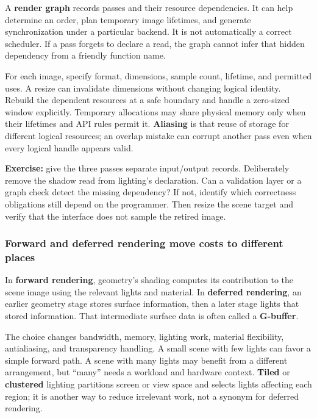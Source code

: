 A \textbf{render graph} records passes and their resource dependencies. It can help determine an order, plan temporary image lifetimes, and generate synchronization under a particular backend. It is not automatically a correct scheduler. If a pass forgets to declare a read, the graph cannot infer that hidden dependency from a friendly function name.

For each image, specify format, dimensions, sample count, lifetime, and permitted uses. A resize can invalidate dimensions without changing logical identity. Rebuild the dependent resources at a safe boundary and handle a zero-sized window explicitly. Temporary allocations may share physical memory only when their lifetimes and API rules permit it. \textbf{Aliasing} is that reuse of storage for different logical resources; an overlap mistake can corrupt another pass even when every logical handle appears valid.

\textbf{Exercise:} give the three passes separate input/output records. Deliberately remove the shadow read from lighting's declaration. Can a validation layer or a graph check detect the missing dependency? If not, identify which correctness obligations still depend on the programmer. Then resize the scene target and verify that the interface does not sample the retired image.

\subsubsection{Forward and deferred rendering move costs to different places}\label{06-engine-ii-ch026-forward-and-deferred-rendering-move-costs-to-different-places}

In \textbf{forward rendering}, geometry's shading computes its contribution to the scene image using the relevant lights and material. In \textbf{deferred rendering}, an earlier geometry stage stores surface information, then a later stage lights that stored information. That intermediate surface data is often called a \textbf{G-buffer}.

The choice changes bandwidth, memory, lighting work, material flexibility, antialiasing, and transparency handling. A small scene with few lights can favor a simple forward path. A scene with many lights may benefit from a different arrangement, but ``many'' needs a workload and hardware context. \textbf{Tiled} or \textbf{clustered} lighting partitions screen or view space and selects lights affecting each region; it is another way to reduce irrelevant work, not a synonym for deferred rendering.

